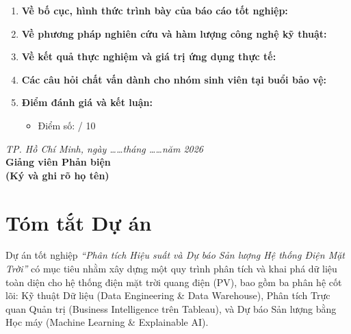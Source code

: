\documentclass[12pt, a4paper]{report}
\begin{document}
\begin{enumerate}[label=\textbf{\arabic*.}, leftmargin=*]
    \item \textbf{Về bố cục, hình thức trình bày của báo cáo tốt nghiệp:}
    \vspace{0.8cm}
    \dotfill
    \vspace{0.8cm}
    \dotfill
    
    \item \textbf{Về phương pháp nghiên cứu và hàm lượng công nghệ kỹ thuật:}
    \vspace{0.8cm}
    \dotfill
    \vspace{0.8cm}
    \dotfill
    
    \item \textbf{Về kết quả thực nghiệm và giá trị ứng dụng thực tế:}
    \vspace{0.8cm}
    \dotfill
    \vspace{0.8cm}
    \dotfill
    
    \item \textbf{Các câu hỏi chất vấn dành cho nhóm sinh viên tại buổi bảo vệ:}
    \vspace{0.8cm}
    \dotfill
    \vspace{0.8cm}
    \dotfill
    
    \item \textbf{Điểm đánh giá và kết luận:}
    \vspace{0.6cm}
    \dotfill
    \begin{itemize}[noitemsep]
        \item Điểm số: \dotfill / 10
    \end{itemize}
\end{enumerate}

\vspace{1cm}
\begin{flushright}
    \textit{TP. Hồ Chí Minh, ngày \dots\dots tháng \dots\dots năm 2026} \\[5pt]
    \textbf{Giảng viên Phản biện} \\[40pt]
    \textbf{(Ký và ghi rõ họ tên)}
\end{flushright}


\chapter*{Tóm tắt Dự án}

Dự án tốt nghiệp \textit{``Phân tích Hiệu suất và Dự báo Sản lượng Hệ thống Điện Mặt Trời''} có mục tiêu nhằm xây dựng một quy trình phân tích và khai phá dữ liệu toàn diện cho hệ thống điện mặt trời quang điện (PV), bao gồm ba phân hệ cốt lõi: Kỹ thuật Dữ liệu (Data Engineering \& Data Warehouse), Phân tích Trực quan Quản trị (Business Intelligence trên Tableau), và Dự báo Sản lượng bằng Học máy (Machine Learning \& Explainable AI).
\end{document}

